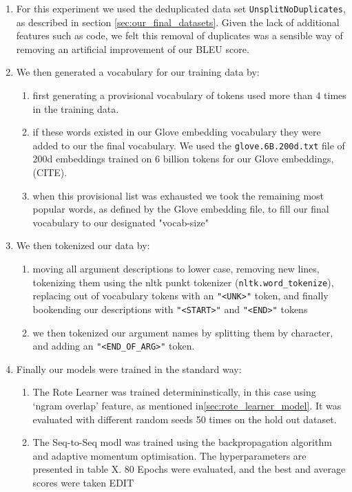 \begin{enumerate}
    \item For this experiment we used the deduplicated data set \texttt{UnsplitNoDuplicates}, as described in section \ref{sec:our_final_datasets}. 
    Given the lack of additional features such as code, we felt this removal of duplicates was a sensible way of removing an artificial improvement of our BLEU score. 
    \item We then generated a vocabulary for our training data by:
    \begin{enumerate}
        \item first generating a provisional vocabulary of tokens used more than 4 times in the training data.
        \item if these words existed in our Glove embedding vocabulary they were added to our the final vocabulary. We used the  \texttt{glove.6B.200d.txt} file of 200d embeddings trained on 6 billion tokens for our Glove embeddings, (CITE). 
        \item when this provisional list was exhausted we took the remaining most popular words, as defined by the Glove embedding file, to fill our final vocabulary to our designated "vocab-size"
    \end{enumerate}

    \item We then tokenized our data by: 
     \begin{enumerate}
         \item moving all argument descriptions to lower case, removing new lines, tokenizing them using the nltk punkt tokenizer (\texttt{nltk.word_tokenize}), replacing out of vocabulary tokens with an \texttt{"<UNK>"} token, and finally bookending our descriptions with \texttt{"<START>"} and \texttt{"<END>"} tokens
         \item we then tokenized our argument names by splitting them by character, and adding an \texttt{"<END_OF_ARG>"} token.
     \end{enumerate}

    \item Finally our models were trained in the standard way:
    \begin{enumerate}
        \item The Rote Learner was trained determininstically, in this case using `ngram overlap' feature, as mentioned in\ref{sec:rote_learner_model}. It was evaluated with different random seeds 50 times on the hold out dataset.
        \item The Seq-to-Seq modl was trained using the backpropagation algorithm and adaptive momentum optimisation. The hyperparameters are presented in table X. 80 Epochs were evaluated, and the best and average scores were taken EDIT
    \end{enumerate}


\end{enumerate}
